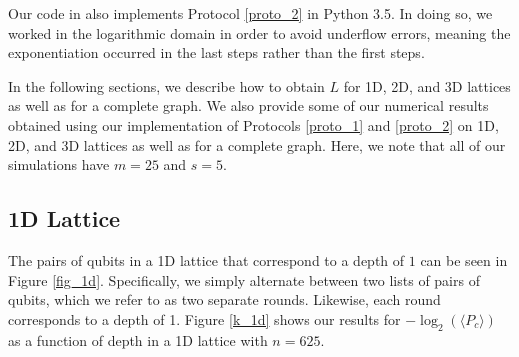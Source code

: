 \documentclass[11pt]{article}
\theoremstyle{definition}
\theoremstyle{plain}
\begin{document}
Our code in {\cite{matthewkhoury96}} also implements Protocol {\ref{proto_2}} in Python 3.5. In doing so, we worked in the logarithmic domain in order to avoid underflow errors, meaning the exponentiation occurred in the last steps rather than the first steps. 

In the following sections, we describe how to obtain $L$ for 1D, 2D, and 3D lattices as well as for a complete graph. We also provide some of our numerical results obtained using our implementation of Protocols {\ref{proto_1}} and {\ref{proto_2}} on 1D, 2D, and 3D lattices as well as for a complete graph. Here, we note that all of our simulations have $m = 25$ and $s = 5$. 

\subsection{1D Lattice}\label{1d_lattice}
The pairs of qubits in a 1D lattice that correspond to a depth of $1$ can be seen in Figure {\ref{fig_1d}}. Specifically, we simply alternate between two lists of pairs of qubits, which we refer to as two separate rounds. Likewise, each round corresponds to a depth of 1. Figure {\ref{k_1d}} shows our results for $-\log_2(\langle P_c \rangle)$ as a function of depth in a 1D lattice with $n = 625$.  
\end{document}
